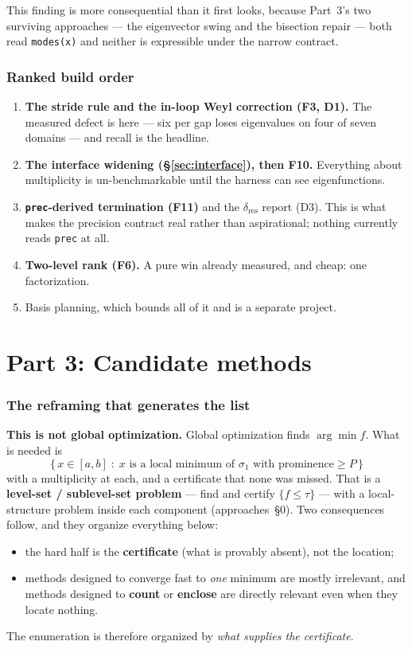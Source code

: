 \documentclass[11pt]{article}
\newcommand{\ap}[1]{(approaches~\S#1)}
\newcommand{\sig}{\sigma}
\newcommand{\sione}{\sig_1}
\begin{document}
This finding is more consequential than it first looks, because Part~3's two surviving approaches
--- the eigenvector swing and the bisection repair --- both read \verb|modes(x)| and neither is
expressible under the narrow contract.

\section{Ranked build order}

\begin{enumerate}[nosep]
\item \textbf{The stride rule and the in-loop Weyl correction (F3, D1).} The measured defect is
  here --- six per gap loses eigenvalues on four of seven domains --- and recall is the headline.
\item \textbf{The interface widening (\S\ref{sec:interface}), then F10.} Everything about
  multiplicity is un-benchmarkable until the harness can see eigenfunctions.
\item \textbf{\texttt{prec}-derived termination (F11)} and the $\delta_{\mathrm{res}}$ report
  (D3). This is what makes the precision contract real rather than aspirational; nothing
  currently reads \verb|prec| at all.
\item \textbf{Two-level rank (F6).} A pure win already measured, and cheap: one factorization.
\item Basis planning, which bounds all of it and is a separate project.
\end{enumerate}

\part*{Part 3: Candidate methods}

\section{The reframing that generates the list}
\label{sec:reframe}

\textbf{This is not global optimization.} Global optimization finds $\arg\min f$. What is needed
is
\[
  \{\, x \in [a,b] \;:\; x \text{ is a local minimum of } \sione \text{ with prominence} \ge P \,\}
\]
with a multiplicity at each, and a certificate that none was missed. That is a
\textbf{level-set / sublevel-set problem} --- find and certify $\{f \le \tau\}$ --- with a
local-structure problem inside each component \ap{0}. Two consequences follow, and they organize
everything below:
\begin{itemize}[nosep]
\item the hard half is the \textbf{certificate} (what is provably absent), not the location;
\item methods designed to converge fast to \emph{one} minimum are mostly irrelevant, and methods
  designed to \textbf{count} or \textbf{enclose} are directly relevant even when they locate
  nothing.
\end{itemize}
The enumeration is therefore organized by \emph{what supplies the certificate}.
\end{document}
